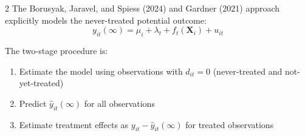 \documentclass[12pt]{article}
\begin{document}
\begin{multicols}{2}
The Borusyak, Jaravel, and Spiess (2024) and Gardner (2021) approach explicitly models the never-treated potential outcome:
$$
  y_{it}(\infty) = \mu_i + \lambda_t + f_t(\bm{X}_i) + u_{it}
$$

The two-stage procedure is:
\begin{enumerate}
  \item Estimate the model using observations with $d_{it} = 0$ (never-treated and not-yet-treated)
  \item Predict $\hat{y}_{it}(\infty)$ for all observations
  \item Estimate treatment effects as $y_{it} - \hat{y}_{it}(\infty)$ for treated observations
\end{enumerate}



\end{multicols}
\end{document}
